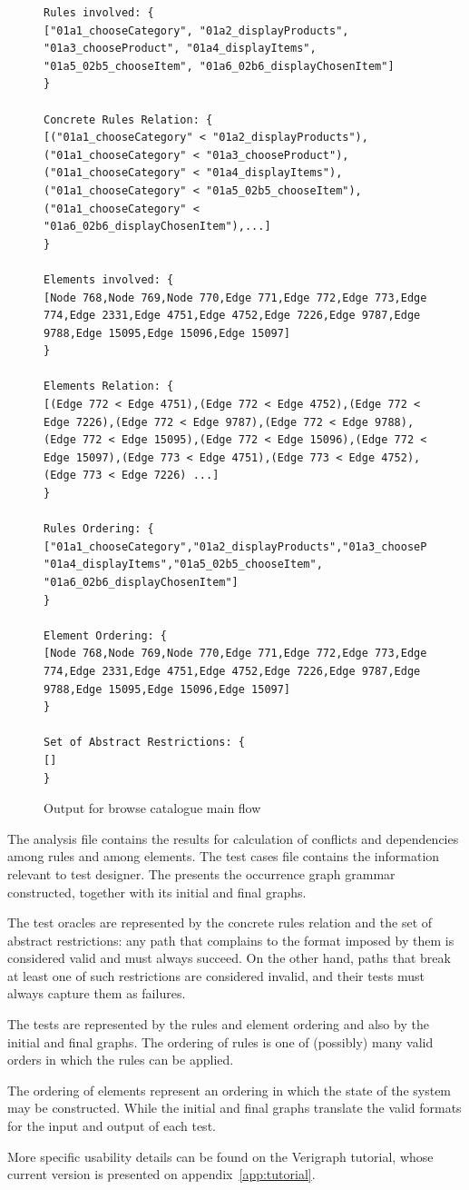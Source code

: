 \begin{figure}[!ht]
\caption{Output for browse catalogue main flow}
\begin{verbatim}
Rules involved: {
["01a1_chooseCategory", "01a2_displayProducts", "01a3_chooseProduct", "01a4_displayItems", "01a5_02b5_chooseItem", "01a6_02b6_displayChosenItem"]
}

Concrete Rules Relation: {
[("01a1_chooseCategory" < "01a2_displayProducts"), ("01a1_chooseCategory" < "01a3_chooseProduct"), ("01a1_chooseCategory" < "01a4_displayItems"), ("01a1_chooseCategory" < "01a5_02b5_chooseItem"), ("01a1_chooseCategory" < "01a6_02b6_displayChosenItem"),...]
}

Elements involved: {
[Node 768,Node 769,Node 770,Edge 771,Edge 772,Edge 773,Edge 774,Edge 2331,Edge 4751,Edge 4752,Edge 7226,Edge 9787,Edge 9788,Edge 15095,Edge 15096,Edge 15097]
}

Elements Relation: {
[(Edge 772 < Edge 4751),(Edge 772 < Edge 4752),(Edge 772 < Edge 7226),(Edge 772 < Edge 9787),(Edge 772 < Edge 9788),(Edge 772 < Edge 15095),(Edge 772 < Edge 15096),(Edge 772 < Edge 15097),(Edge 773 < Edge 4751),(Edge 773 < Edge 4752),(Edge 773 < Edge 7226) ...]
}

Rules Ordering: {
["01a1_chooseCategory","01a2_displayProducts","01a3_chooseProduct", "01a4_displayItems","01a5_02b5_chooseItem", "01a6_02b6_displayChosenItem"]
}

Element Ordering: {
[Node 768,Node 769,Node 770,Edge 771,Edge 772,Edge 773,Edge 774,Edge 2331,Edge 4751,Edge 4752,Edge 7226,Edge 9787,Edge 9788,Edge 15095,Edge 15096,Edge 15097]
}

Set of Abstract Restrictions: {
[]
}
\end{verbatim}
  \label{fig:tests:relation}
\end{figure}
The analysis file contains the results for calculation of conflicts and dependencies among rules and among elements. The test cases file contains the information relevant to test designer.
The  presents the occurrence graph grammar constructed, together with its initial and final graphs.

The test oracles are represented by the concrete rules relation and the set of abstract restrictions: any path that complains to the format imposed by them is considered valid and must always succeed. On the other hand, paths that break at least one of such restrictions are considered invalid, and their tests must always capture them as failures.

The tests are represented by the rules and element ordering and also by the initial and final graphs. The ordering of rules is one of (possibly) many valid orders in which the rules can be applied.

The ordering of elements represent an ordering in which the state of the system may be constructed. While the initial and final graphs translate the valid formats for the input and output of each test.

More specific usability details can be found on the Verigraph tutorial, whose current version is presented on appendix~\ref{app:tutorial}.

